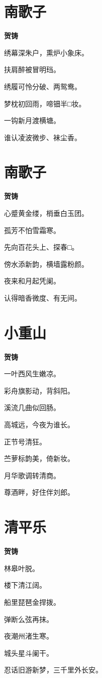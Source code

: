 \documentclass[12pt,a4paper]{ctexbook}
\begin{document}
\section{南歌子}
\textbf{贺铸}\par\vspace{0.5em}
绣幕深朱户，熏炉小象床。\par
扶肩醉被冒明珰。\par
绣履可怜分破、两鸳鸯。\par
梦枕初回雨，啼钿半□妆。\par
一钩新月渡横塘。\par
谁认凌波微步、袜尘香。\par

\section{南歌子}
\textbf{贺铸}\par\vspace{0.5em}
心蹙黄金缕，梢垂白玉团。\par
孤芳不怕雪霜寒。\par
先向百花头上、探春□。\par
傍水添新韵，横墙露粉颜。\par
夜来和月起凭阑。\par
认得暗香微度、有无间。\par

\section{小重山}
\textbf{贺铸}\par\vspace{0.5em}
一叶西风生嫩凉。\par
彩舟旗影动，背斜阳。\par
溪流几曲似回肠。\par
高城远，今夜为谁长。\par
正节号清狂。\par
苎萝标韵美，倚新妆。\par
月华歌调转清商。\par
尊酒畔，好住伴刘郎。\par

\section{清平乐}
\textbf{贺铸}\par\vspace{0.5em}
林皋叶脱。\par
楼下清江阔。\par
船里琵琶金捍拨。\par
弹断么弦再抹。\par
夜潮州渚生寒。\par
城头星斗阑干。\par
忍话旧游新梦，三千里外长安。\par
\end{document}
